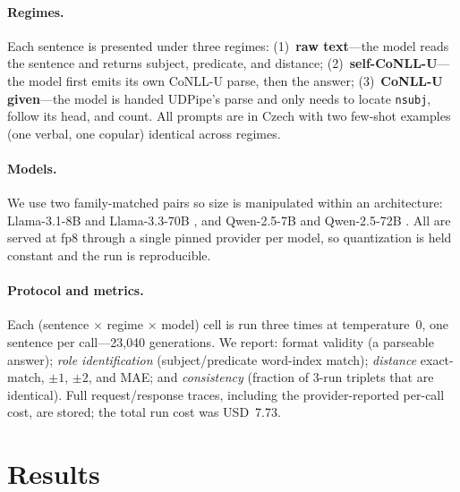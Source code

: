 \documentclass[11pt]{article}
\begin{document}
\paragraph{Regimes.} Each sentence is presented under three regimes: (1)~\textbf{raw text}---the
model reads the sentence and returns subject, predicate, and distance; (2)~\textbf{self-CoNLL-U}---the
model first emits its own CoNLL-U parse, then the answer; (3)~\textbf{CoNLL-U given}---the model is
handed UDPipe's parse and only needs to locate \texttt{nsubj}, follow its head, and count. All
prompts are in Czech with two few-shot examples (one verbal, one copular) identical across regimes.

\paragraph{Models.} We use two family-matched pairs so size is manipulated within an architecture:
Llama-3.1-8B and Llama-3.3-70B \citep{dubey2024llama}, and Qwen-2.5-7B and Qwen-2.5-72B
\citep{qwen2025}. All are served at fp8 through a single pinned provider per model, so quantization
is held constant and the run is reproducible.

\paragraph{Protocol and metrics.} Each (sentence $\times$ regime $\times$ model) cell is run three
times at temperature~0, one sentence per call---23{,}040 generations. We report: format validity
(a parseable answer); \emph{role identification} (subject/predicate word-index match); \emph{distance}
exact-match, $\pm1$, $\pm2$, and MAE; and \emph{consistency} (fraction of 3-run triplets that are
identical). Full request/response traces, including the provider-reported per-call cost, are stored;
the total run cost was USD~7.73.

\section{Results}
\end{document}
